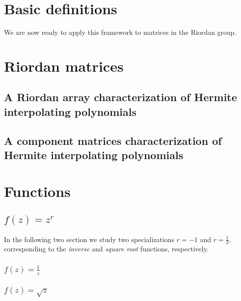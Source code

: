 
\section{Basic definitions}



We are now ready to apply this framework to matrices in the Riordan group.

\section{Riordan matrices}



\subsection{A Riordan array characterization of Hermite interpolating polynomials}



\subsection{A component matrices characterization of Hermite interpolating polynomials}



\section{Functions}

\subsection{$f(z)=z^{r}$}



In the following two section we study two specializations $r=-1$ and
$r=\frac{1}{2}$, corresponding to the \textit{inverse} and \textit{square root}
functions, respectively.

\subsubsection{$f(z)=\frac{1}{z}$}



\subsubsection{$f(z)=\sqrt{z}$}

